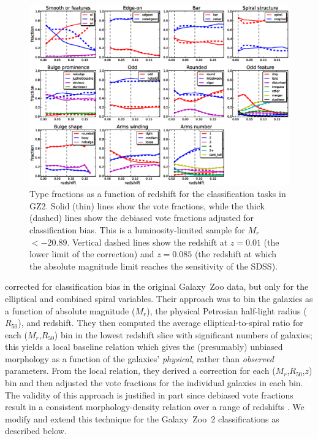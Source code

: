 \documentclass[useAMS,usenatbib]{mn2e}
\newcommand{\mr}{$M_r$}
\newcommand{\rfifty}{$R_{50}$}
\begin{document}
\begin{figure}
\includegraphics[angle=0,width=7.0in]{figures/gz2_type_fractions.eps}
\caption{Type fractions as a function of redshift for the classification tasks in GZ2. Solid (thin) lines show the vote fractions, while the thick (dashed) lines show the debiased vote fractions adjusted for classification bias. This is a luminosity-limited sample for \mr~$<-20.89$. Vertical dashed lines show the redshift at $z=0.01$ (the lower limit of the correction) and $z=0.085$ (the redshift at which the absolute magnitude limit reaches the sensitivity of the SDSS). 
\label{fig-type_fractions}}
\end{figure}

\citet{bam09} corrected for classification bias in the original Galaxy~Zoo data, but only for the elliptical and combined spiral variables. Their approach was to bin the galaxies as a function of absolute magnitude (\mr), the physical Petrosian half-light radius (\rfifty), and redshift. They then computed the average elliptical-to-spiral ratio for each (\mr,\rfifty) bin in the lowest redshift slice with significant numbers of galaxies; this yields a local baseline relation which gives the (presumably) unbiased morphology as a function of the galaxies' {\em physical}, rather than {\em observed} parameters. From the local relation, they derived a correction for each (\mr,\rfifty,$z$) bin and then adjusted the vote fractions for the individual galaxies in each bin. The validity of this approach is justified in part since debiased vote fractions result in a consistent morphology-density relation over a range of redshifts \citep{bam09}. We modify and extend this technique for the Galaxy~Zoo~2 classifications as described below. 
\end{document}
